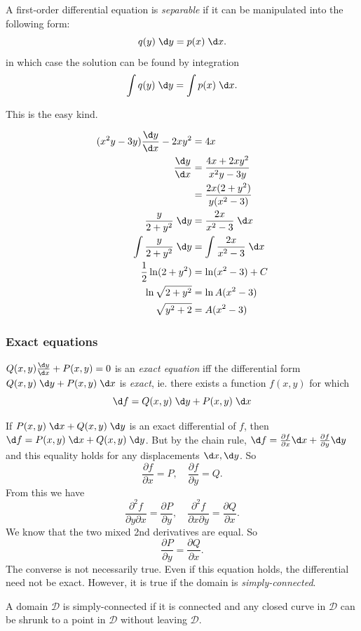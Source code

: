 \documentclass[a4paper]{article}
\begin{document}
\begin{defi}
  A first-order differential equation is \emph{separable} if it can be manipulated into the following form:
  \[
    q(y) \;\d y = p(x) \;\d x.
  \]
  in which case the solution can be found by integration
  \[
    \int q(y)\;\d y = \int p(x)\; \d x.
  \]
\end{defi}
This is the easy kind.

\begin{eg}
  \begin{align*}
    (x^2y - 3y)\frac{\d y}{\d x} - 2xy^2 &= 4x\\
    \frac{\d y}{\d x} &= \frac{4x + 2xy^2}{x^2y - 3y}\\
    &= \frac{2x(2 +  y^2)}{y(x^2 - 3)}\\
    \frac{y}{2 + y^2}\; \d y &= \frac{2x}{x^2 - 3}\;\d x\\
    \int \frac{y}{2 + y^2}\; \d y &= \int\frac{2x}{x^2 - 3}\;\d x\\
    \frac{1}{2}\ln(2 + y^2) &= \ln (x^2 - 3) + C\\
    \ln \sqrt{2 + y^2} &= \ln A(x^2 - 3)\\
    \sqrt{y^2 + 2} &= A(x^2 - 3)
  \end{align*}
\end{eg}
\subsubsection{Exact equations}
\begin{defi}
  $Q(x, y)\frac{\d y}{\d x} + P(x, y) = 0$ is an \emph{exact equation} iff the differential form $Q(x, y)\;\d y + P(x, y)\;\d x$ is \emph{exact}, ie. there exists a function $f(x, y)$ for which
  \[
    \d f = Q(x, y)\;\d y + P(x, y)\;\d x
  \]
\end{defi}

If $P(x, y)\;\d x + Q(x, y)\;\d y$ is an exact differential of $f$, then $\d f = P(x, y) \;\d x + Q(x, y)\;\d y$. But by the chain rule, $\d f  = \frac{\partial f}{\partial x}\d x + \frac{\partial f}{\partial y}\d y$ and this equality holds for any displacements $\d x, \d y$. So
\[
  \frac{\partial f}{\partial x} = P,\quad\frac{\partial f}{\partial y} = Q.
\]
From this we have
\[
  \frac{\partial^2 f}{\partial y\partial x} = \frac{\partial P}{\partial y},\quad\frac{\partial^2 f}{\partial x \partial y} = \frac{\partial Q}{\partial x}.
\]
We know that the two mixed 2nd derivatives are equal. So
\[
  \frac{\partial P}{\partial y} = \frac{\partial Q}{\partial x}.
\]
The converse is not necessarily true. Even if this equation holds, the differential need not be exact. However, it is true if the domain is \emph{simply-connected}.
\begin{defi}
  A domain $\mathcal{D}$ is simply-connected if it is connected and any closed curve in $\mathcal{D}$ can be shrunk to a point in $\mathcal{D}$ without leaving $\mathcal{D}$.
\end{defi}
\end{document}
